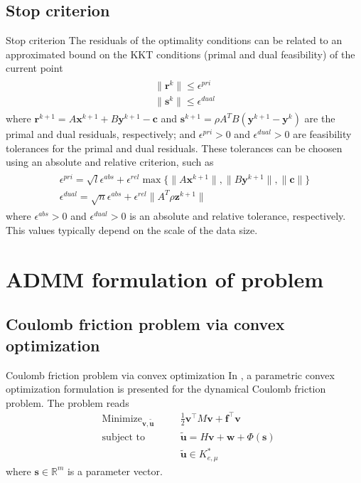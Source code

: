 \documentclass[8pt,red]{beamer}
\theoremstyle{plain}
\theoremstyle{definition}
\theoremstyle{remark}
\newcommand{\MIN}{\mathop{\mathrm{Minimize}}}
\newcommand{\ST}{\mathop{\mathrm{subject~to}}}
\renewcommand{\Re}{\ensuremath{\mathbb{R}}}
\newcommand{\bi}[1]{\ensuremath{\boldsymbol{#1}}}
\begin{document}
\subsection{Stop criterion}
\begin{frame}{Stop criterion}
The residuals of the optimality conditions can be related to an approximated bound on the KKT conditions (primal and dual feasibility) of the current point
\begin{align}
\begin{array}{l}
  \| \bi{r}^{k} \| \leq \epsilon^{pri} \\
  \| \bi{s}^{k} \| \leq \epsilon^{dual}  
\end{array} \label{eq.stopcriterion}
\end{align}
where $\bi{r}^{k+1} = A \bi{x}^{k+1} + B \bi{y}^{k+1} - \bi{c}$ and $\bi{s}^{k+1} = \rho A^{T} B \left( \bi{y}^{k+1} - \bi{y}^{k} \right)$ are the primal and dual residuals, respectively; and $\epsilon^{pri} > 0$ and $\epsilon^{dual} > 0$ are feasibility tolerances for the primal and dual residuals. These tolerances can be choosen using an absolute and relative criterion, such as
\begin{align}
\begin{array}{l}
  \epsilon^{pri} = \sqrt{l} \epsilon^{abs} + \epsilon^{rel} \max \lbrace \|A \bi{x}^{k+1}\|,\|B \bi{y}^{k+1}\|, \|\bi{c}\|  \rbrace \\
  \epsilon^{dual} = \sqrt{n} \epsilon^{abs} + \epsilon^{rel} \|A^{T} \rho \bi{z}^{k+1}\| 
\end{array}
\end{align}
where $\epsilon^{abs} > 0$ and $\epsilon^{dual} > 0$ is an absolute and relative tolerance, respectively. This values typically depend on the scale of the data size.
\end{frame}

\section{ADMM formulation of problem}

\subsection{Coulomb friction problem via convex optimization}
\begin{frame}{Coulomb friction problem via convex optimization}
In \citep{acary2011formulation}, a parametric convex optimization formulation is presented for the dynamical Coulomb friction problem. The problem reads 
\begin{subequations}\label{P.original.friction.SOCP.1}%
  \begin{alignat}{3}
    & \MIN_{\bi{v}, \tilde{\bi{u}}}  &{\quad}& 
    \frac{1}{2} \bi{v}^{\top} M \bi{v} + \bi{f}^{\top} \bi{v} \\
    & \ST && 
    \tilde{\bi{u}} = H \bi{v} + \bi{w} + \Phi(\bi{s})  \\
    & && 
    \tilde{\bi{u}} \in K_{e,\mu}^{*} 
  \end{alignat}
\end{subequations}
where $\bi{s} \in \Re^{m}$ is a parameter vector. 
\end{frame}
\end{document}
